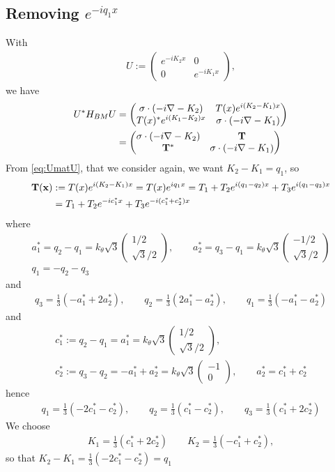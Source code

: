 \documentclass[11pt,a4paper,reqno,french,tikz]{amsart}
\newcommand{\pa}[1]{\left( #1 \right)} %
\newcommand{\na}{\nabla} %
\newcommand{\f}[2]{\frac{#1}{#2}} %
\newcommand{\mat}[1]{\begin{pmatrix} #1 \end{pmatrix}} %
\begin{document}
\subsection{Removing $e^{-iq_1 x}$}%


With 
\begin{align}\label{def:U}
U := \mat{e^{-iK_2 x} & 0 \\ 0 & e^{-iK_1 x}},
\end{align}
we have
\begin{align*}
	U^* H_{BM} U &= \mat{\sigma \cdot \pa{-i\na  - K_2} & T(x) e^{i\pa{K_2 - K_1}x} \\ T(x)^*e^{i\pa{K_1 - K_2}x} & \sigma\cdot \pa{-i\na  -K_1}} \\
		&= \mat{\sigma \cdot \pa{-i\na -K_2} & \bf{T} \\ \bf{T}^* & \sigma \cdot \pa{-i\na -K_1}}
\end{align*}
From \eqref{eq:UmatU}, that we consider again, we want $K_2- K_1 = q_1$, so 
\begin{align*}
	\bf{T}(x) &:= T(x) e^{i(K_2-K_1)x} = T(x) e^{iq_1 x} = T_1 +T_2 e^{i(q_1 - q_2)x} +T_3 e^{i(q_1 - q_3)x} \\
& = T_1 +T_2 e^{-ic_1^*x} +T_3 e^{-i\pa{c_1^*+c_2^*}x}
\end{align*}
where
\begin{multline*}
	a_1^* = q_2 - q_1 = k_\theta \sqrt{3} \mat{1/2 \\ \sqrt{3}/2},\qquad a_2^* = q_3 - q_1 = k_\theta \sqrt{3} \mat{-1/2 \\ \sqrt{3}/2} \\
	q_1 = -q_2 - q_3
\end{multline*}
and
\begin{align*}
q_3 = \f 13 \pa{-a_1^* + 2 a_2^*},\qquad q_2 = \f 13 \pa{ 2 a_1^* - a_2^*},\qquad q_1 = \f 13 \pa{-a_1^* - a_2^*}
\end{align*}
and
\begin{multline*}
c_1^* := q_2 - q_1 = a_1^* = k_\theta \sqrt{3} \mat{1/2 \\ \sqrt{3}/2}, \\
c_2^* := q_3 - q_2 = -a_1^* + a_2^* = k_\theta \sqrt{3} \mat{-1 \\ 0}, \qquad a_2^* = c_1^* + c_2^*
\end{multline*}
hence
\begin{align*}
q_1 = \f 13\pa{-2c_1^* - c_2^*}, \qquad q_2 = \f 13\pa{c_1^* - c_2^*},\qquad q_3 = \f 13\pa{c_1^* +2 c_2^*}
\end{align*}
We choose
\begin{align*}
K_1 = \f 13 \pa{c_1^* + 2 c_2^*}\qquad K_2 = \f 13 \pa{ -c_1^* + c_2^*},
\end{align*}
so that $K_2 - K_1 = \f 13 \pa{-2c_1^* - c_2^*} = q_1$ 
\end{document}

